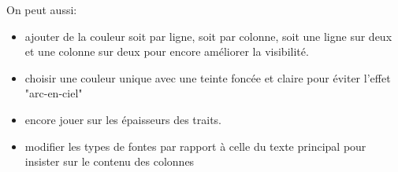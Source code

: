 On peut aussi:

\begin{itemize}
\item ajouter de la couleur soit par ligne, soit par colonne, soit une ligne sur deux et une colonne sur deux pour encore améliorer la visibilité.
\item choisir une couleur unique avec une teinte foncée et claire pour éviter l'effet "arc-en-ciel"
\item encore jouer sur les épaisseurs des traits.
\item modifier les types de fontes par rapport à celle du texte principal pour insister sur le contenu des colonnes
\end{itemize}





